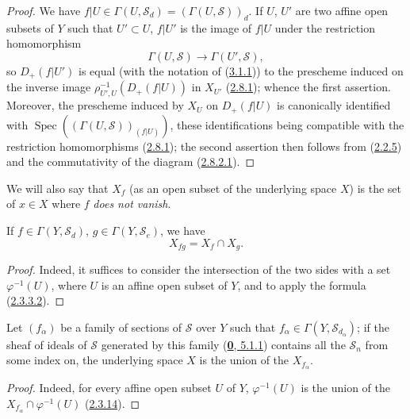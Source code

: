 \begin{proof}
We have $f|U\in\Gamma(U,\mathcal{S}_d)=(\Gamma(U,\mathcal{S}))_d$. If $U$,
$U'$ are two affine open subsets of $Y$ such that $U'\subset U$, $f|U'$ is
the image of $f|U$ under the restriction homomorphism
\[
  \Gamma(U,\mathcal{S})\longrightarrow\Gamma(U',\mathcal{S}),
\]
so $D_+(f|U')$ is equal (with the notation of
(\hyperref[II.3.1.1]{3.1.1})) to the prescheme induced on the inverse image
$\rho_{U',U}^{-1}(D_+(f|U))$ in $X_{U'}$
(\hyperref[II.2.8.1]{2.8.1}); whence the first assertion. Moreover, the
prescheme induced by $X_U$ on $D_+(f|U)$ is canonically identified with
$\operatorname{Spec}((\Gamma(U,\mathcal{S}))_{(f|U)})$, these identifications
being compatible with the restriction homomorphisms
(\hyperref[II.2.8.1]{2.8.1}); the second assertion then follows from
(\hyperref[II.2.2.5]{2.2.5}) and the commutativity of the diagram
(\hyperref[II.2.8.2.1]{2.8.2.1}).
\end{proof}

We will also say that $X_f$ (as an open subset of the underlying space $X$)
is the set of $x\in X$ where $f$ \emph{does not vanish}.

\begin{corollary}[3.1.5]
\label{II.3.1.5}
If $f\in\Gamma(Y,\mathcal{S}_d)$, $g\in\Gamma(Y,\mathcal{S}_e)$, we have
\[
\label{II.3.1.5.1}
  X_{fg}=X_f\cap X_g.
\tag{3.1.5.1}
\]
\end{corollary}

\begin{proof}
Indeed, it suffices to consider the intersection of the two sides with a set
$\varphi^{-1}(U)$, where $U$ is an affine open subset of $Y$, and to apply
the formula (\hyperref[II.2.3.3.2]{2.3.3.2}).
\end{proof}

\begin{corollary}[3.1.6]
\label{II.3.1.6}
Let $(f_\alpha)$ be a family of sections of $\mathcal{S}$ over $Y$ such that
$f_\alpha\in\Gamma(Y,\mathcal{S}_{d_\alpha})$; if the sheaf of ideals of
$\mathcal{S}$ generated by this family
\textup{(\hyperref[0.5.1.1]{\textbf{0}, 5.1.1})} contains all the $\mathcal{S}_n$ from some
index on, the underlying space $X$ is the union of the $X_{f_\alpha}$.
\end{corollary}

\begin{proof}
Indeed, for every affine open subset $U$ of $Y$, $\varphi^{-1}(U)$ is the
union of the $X_{f_\alpha}\cap\varphi^{-1}(U)$
(\hyperref[II.2.3.14]{2.3.14}).
\end{proof}

